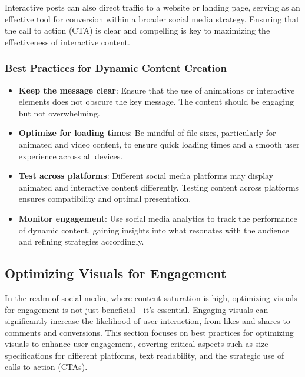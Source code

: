 \documentclass[
]{book}
\providecommand{\tightlist}{%
  \setlength{\itemsep}{0pt}\setlength{\parskip}{0pt}}
\begin{document}
Interactive posts can also direct traffic to a website or landing page, serving as an effective tool for conversion within a broader social media strategy. Ensuring that the call to action (CTA) is clear and compelling is key to maximizing the effectiveness of interactive content.

\hypertarget{best-practices-for-dynamic-content-creation}{%
\subsubsection*{Best Practices for Dynamic Content Creation}\label{best-practices-for-dynamic-content-creation}}

\begin{itemize}
\tightlist
\item
  \textbf{Keep the message clear}: Ensure that the use of animations or interactive elements does not obscure the key message. The content should be engaging but not overwhelming.
\item
  \textbf{Optimize for loading times}: Be mindful of file sizes, particularly for animated and video content, to ensure quick loading times and a smooth user experience across all devices.
\item
  \textbf{Test across platforms}: Different social media platforms may display animated and interactive content differently. Testing content across platforms ensures compatibility and optimal presentation.
\item
  \textbf{Monitor engagement}: Use social media analytics to track the performance of dynamic content, gaining insights into what resonates with the audience and refining strategies accordingly.
\end{itemize}

\hypertarget{optimizing-visuals-for-engagement}{%
\subsection*{Optimizing Visuals for Engagement}\label{optimizing-visuals-for-engagement}}

In the realm of social media, where content saturation is high, optimizing visuals for engagement is not just beneficial---it's essential. Engaging visuals can significantly increase the likelihood of user interaction, from likes and shares to comments and conversions. This section focuses on best practices for optimizing visuals to enhance user engagement, covering critical aspects such as size specifications for different platforms, text readability, and the strategic use of calls-to-action (CTAs).
\end{document}
